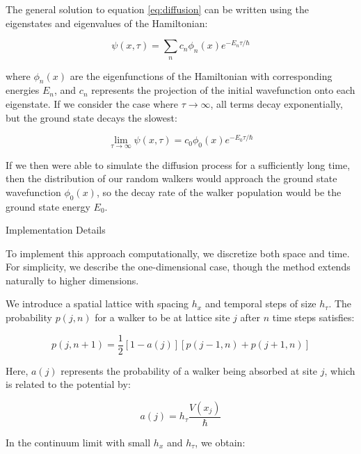 \documentclass[reqno]{amsart}
\makeatletter
\renewcommand\subsection{\@startsection{subsection}{2}%
  \z@{.5\linespacing\@plus.7\linespacing}{-.5em}%
  {\normalfont\scshape\justify}}
\numberwithin{equation}{section}
\numberwithin{figure}{section}
\makeatother
\begin{document}
The general solution to equation \ref{eq:diffusion} can be written using the eigenstates and eigenvalues of the Hamiltonian:

\begin{equation}
\psi(x,\tau) = \sum_n c_n \phi_n(x)e^{-E_n\tau/\hbar}
\end{equation}

where $\phi_n(x)$ are the eigenfunctions of the Hamiltonian with corresponding energies $E_n$, and $c_n$ represents the projection of the initial wavefunction onto each eigenstate. If we consider the case where $\tau \to \infty$, all terms decay exponentially, but the ground state decays the slowest:

\begin{equation}
\lim_{\tau \to \infty}\psi(x,\tau) = c_0\phi_0(x)e^{-E_0\tau/\hbar}
\end{equation}

If we then were able to simulate the diffusion process for a sufficiently long time, then the distribution of our random walkers would approach the ground state wavefunction $\phi_0(x)$, so the decay rate of the walker population would be the ground state energy $E_0$.

\subsection{Implementation Details}

To implement this approach computationally, we discretize both space and time. For simplicity, we describe the one-dimensional case, though the method extends naturally to higher dimensions.

We introduce a spatial lattice with spacing $h_x$ and temporal steps of size $h_\tau$. The probability $p(j,n)$ for a walker to be at lattice site $j$ after $n$ time steps satisfies:

\begin{equation}
p(j,n+1) = \frac{1}{2}[1-a(j)][p(j-1,n) + p(j+1,n)]
\end{equation}

Here, $a(j)$ represents the probability of a walker being absorbed at site $j$, which is related to the potential by:

\begin{equation}
a(j) = h_\tau \frac{V(x_j)}{\hbar}
\end{equation}

In the continuum limit with small $h_x$ and $h_\tau$, we obtain:
\end{document}
